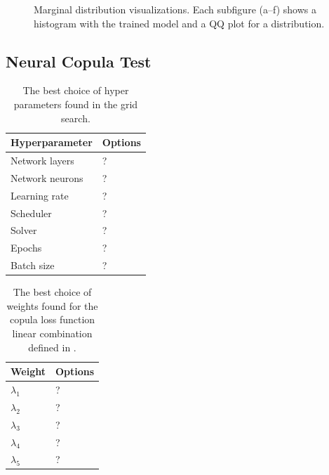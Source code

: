 \begin{figure}
\begin{minipage}{0.45\textwidth}
\begin{minipage}{0.48\textwidth}
        \end{minipage}
    \end{minipage}

    \caption{Marginal distribution visualizations. Each subfigure (a--f) shows a histogram with the trained model and a QQ plot for a distribution.}
    \label{fig:MarginalResults}
\end{figure}


\subsection{Neural Copula Test}

\begin{table}[h!]
    \centering
    \caption{The best choice of hyper parameters found in the grid search.}
    \begin{tabular}{ll}
    \textbf{Hyperparameter} & \textbf{Options} \\
    \hline
    Network layers & ? \\
    Network neurons & ? \\
    Learning rate & ? \\
    Scheduler & ? \\
    Solver & ? \\
    Epochs & ? \\
    Batch size & ? \\
    \end{tabular}
    \label{tab:Best_hyperparams}
\end{table}
    
\begin{table}[h!]
    \centering
    \caption{The best choice of weights found for the copula loss function linear combination defined in .}
    \begin{tabular}{ll}
    \textbf{Weight} & \textbf{Options} \\
    \hline
    $\lambda_1$ & ? \\
    $\lambda_2$ & ? \\
    $\lambda_3$ & ? \\
    $\lambda_4$ & ? \\
    $\lambda_5$ & ? \\
    \end{tabular}
    \label{tab:Best_weights}
\end{table}
    




